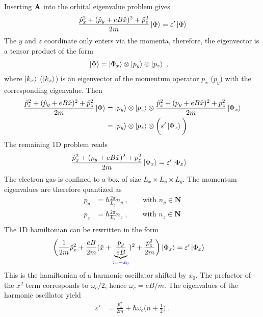 %
Inserting $\mathbf A$ into the orbital eigenvalue problem gives
%
\begin{align*}
 \frac{\hat p_{x}^{2}+(\hat p_{y}+e B \hat x)^{2}+\hat p_{z}^{2}}{2m} \ket{\Phi} =\varepsilon' \ket{\Phi}
\end{align*}
%
The $y$ and $z$ coordinate only enters via the momenta, therefore, the eigenvector is a tensor
product of the form
%
\begin{align*}
\ket{\Phi} &= \ket{\Phi_{x}}\otimes\ket{p_{y}}\otimes\ket{p_{z}}\;,
\end{align*}
%
where $\ket{k_{x}}$ ($\ket{k_{x}}$) is an eigenvector of the momentum operator $p_{x}$
($p_{y}$) with the corresponding eigenvalue. Then
\begin{align*}
 \frac{\hat p_{x}^{2}+(\hat p_{y}+e B \hat x)^{2}+\hat p_{z}^{2}}{2m}   \ket{\Phi}&=
\ket{p_{y}}\otimes\ket{p_{z}}\otimes \frac{\hat p_{x}^{2}+(p_{y}+e B \hat x)^{2}+p_{z}^{2}}{2m} \ket{\Phi_{x}} \\
&=\ket{p_{y}}\otimes\ket{p_{z}}\otimes \bigg(\varepsilon' \ket{\Phi_{x}}\bigg)
\end{align*}
The remaining 1D problem reads
%
\begin{align*}
 \frac{\hat p_{x}^{2}+(p_{y}+e B \hat x)^{2}+p_{z}^{2}}{2m} \ket{\Phi_{x}} 
&=\varepsilon' \ket{\Phi_{x}}
\end{align*}
%
The electron gas is confined to a box of size $L_{x}\times L_{y}\times L_{y}$. The momentum eigenvalues are therefore quantized as
%
\begin{align}
p_{y} &= \hbar \frac{2\pi}{L_{y}} n_{y}\;,\qquad \text{with } n_{y}\in \mathbf N \\
p_{z} &= \hbar \frac{2\pi}{L_{z}} n_{z}\;,\qquad \text{with } n_{z} \in \mathbf N\\
\end{align}
%
The 1D hamiltonian can be rewritten in the form
\begin{align*}
\bigg( \frac{1}{2m}\hat p_{x}^{2}+ \frac{e B}{2m} (\hat x + \underbrace{
\frac{p_{y}}{eB}
}_{\color{blue} := -x_{0}} )^{2}+
 \frac{p_{z}^{2}}{2m} \bigg)\ket{\Phi_{x}} 
&=\varepsilon' \ket{\Phi_{x}}
\end{align*}
This is the hamiltonian of a harmonic oscillator shifted by $x_{0}$. 
The prefactor of the $x^{2}$ term corresponds to $\omega_{c}/2$, hence $\omega_{c}=eB/m$. 
The  eigenvalues of the harmonic oscillator yield
%
\begin{align*}
\varepsilon' &=  \frac{p_{z}^{2}}{2m}  + \hbar \omega_{c} \big( n + \tfrac12 \big)\;.
\end{align*}
